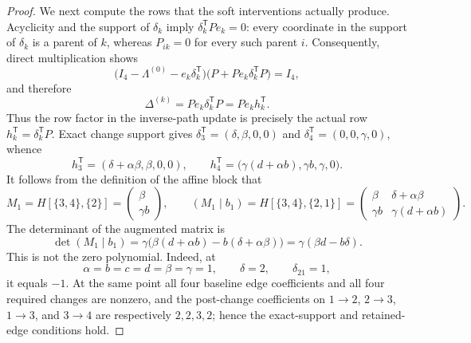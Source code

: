 \documentclass{article}
\begin{document}
\begin{proof}
We next compute the rows that the soft interventions actually produce.  Acyclicity and the support of \(\delta_k\) imply \(\delta_k^{\mathsf T}Pe_k=0\): every coordinate in the support of \(\delta_k\) is a parent of \(k\), whereas \(P_{ik}=0\) for every such parent \(i\).  Consequently, direct multiplication shows
\[
\bigl(I_4-\Lambda^{(0)}-e_k\delta_k^{\mathsf T}\bigr)
\bigl(P+Pe_k\delta_k^{\mathsf T}P\bigr)=I_4,
\]
and therefore
\[
\Delta^{(k)}=Pe_k\delta_k^{\mathsf T}P=Pe_kh_k^{\mathsf T}.
\]
Thus the row factor in the inverse-path update is precisely the actual row \(h_k^{\mathsf T}=\delta_k^{\mathsf T}P\).  Exact change support gives \(\delta_3^{\mathsf T}=(\delta,\beta,0,0)\) and \(\delta_4^{\mathsf T}=(0,0,\gamma,0)\), whence
\[
h_3^{\mathsf T}=(\delta+\alpha\beta,\beta,0,0),
\qquad
h_4^{\mathsf T}=\bigl(\gamma(d+\alpha b),\gamma b,\gamma,0\bigr).
\]
It follows from the definition of the affine block that
\[
M_1=H[\{3,4\},\{2\}]
=\begin{pmatrix}\beta\\\gamma b\end{pmatrix},
\qquad
(M_1\mid b_1)=H[\{3,4\},\{2,1\}]
=\begin{pmatrix}
\beta&\delta+\alpha\beta\\
\gamma b&\gamma(d+\alpha b)
\end{pmatrix}.
\]
The determinant of the augmented matrix is
\[
\det(M_1\mid b_1)
=\gamma\bigl(\beta(d+\alpha b)-b(\delta+\alpha\beta)\bigr)
=\gamma(\beta d-b\delta).
\]
This is not the zero polynomial.  Indeed, at
\[
\alpha=b=c=d=\beta=\gamma=1,
\qquad \delta=2,
\qquad \delta_{21}=1,
\]
it equals \(-1\).  At the same point all four baseline edge coefficients and all four required changes are nonzero, and the post-change coefficients on \(1\to2\), \(2\to3\), \(1\to3\), and \(3\to4\) are respectively \(2,2,3,2\); hence the exact-support and retained-edge conditions hold.


\end{proof}
\end{document}
